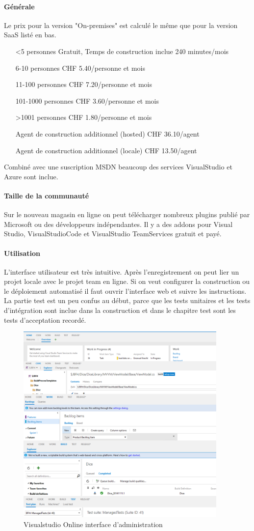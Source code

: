 \paragraph{Générale}  Le prix pour la version "On-premises" est calculé le même que pour la version SaaS listé en bas.
\begin{itemize}
\item[<5 personnes] Gratuit, Temps de construction inclue 240 minutes/mois
\item[6-10 personnes] CHF 5.40/personne et mois
\item[11-100 personnes]  CHF 7.20/personne et mois
\item[101-1000 personnes]  CHF 3.60/personne et mois
\item[>1001 personnes]  CHF 1.80/personne et mois
\item[Agent de construction additionnel (hosted)]  CHF 36.10/agent
\item[Agent de construction additionnel (locale)]  CHF 13.50/agent
\end{itemize}
Combiné avec une suscription MSDN beaucoup des services VisualStudio et Azure sont inclue.
\paragraph{Taille de la communauté} Sur le nouveau magasin en ligne on peut télécharger nombreux plugins publié par Microsoft ou des développeurs indépendantes. Il y a des addons pour Visual Studio, VisualStudioCode et VisualStudio TeamServices gratuit et payé.
\paragraph{Utilisation} L'interface utilisateur est très intuitive. Après l'enregistrement on peut lier un projet locale avec le projet team en ligne. Si on veut configurer la construction ou le déploiement automatisé il faut ouvrir l'interface web et suivre les instructions. 
La partie test est un peu confus au début, parce que les tests unitaires et les tests d'intégration sont inclue dans la construction et dans le chapitre test sont les tests d'acceptation recordé.

\begin{figure}[H]
	\centering
		\includegraphics[height=10cm]{bilder/vso}
	\caption{Visualstudio Online interface d'administration}
	\label{fig:vsogui}
\end{figure}

